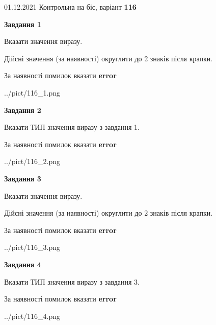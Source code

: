 \documentclass[11pt, ukrainian]{article}
\begin{document}
{01.12.2021 Контрольна на біс, варіант  \No \textbf { 116 }\par}
{
\begin {large}
{\begin {center}\textbf{Завдання 1}\end {center}}\par
Вказати значення виразу. \par
Дійсні значення (за наявності) округлити до 2 знаків після крапки. \par
За наявності помилок вказати \textbf{error}

\begin{center}
	{../pict/116_1.png}
\end{center}
\newpage

{\begin {center}\textbf{Завдання 2}\end {center}}\par
Вказати ТИП значення виразу з завдання 1. \par
За наявності помилок вказати \textbf{error}

\begin{center}
	{../pict/116_2.png}
\end{center}
\newpage

{\begin {center}\textbf{Завдання 3}\end {center}}\par
Вказати значення виразу. \par
Дійсні значення (за наявності) округлити до 2 знаків після крапки. \par
За наявності помилок вказати \textbf{error}

\begin{center}
	{../pict/116_3.png}
\end{center}
\newpage

{\begin {center}\textbf{Завдання 4}\end {center}}\par
Вказати ТИП значення виразу з завдання 3. \par
За наявності помилок вказати \textbf{error}

\begin{center}
	{../pict/116_4.png}
\end{center}
\newpage


\end{large}}
\end{document}
